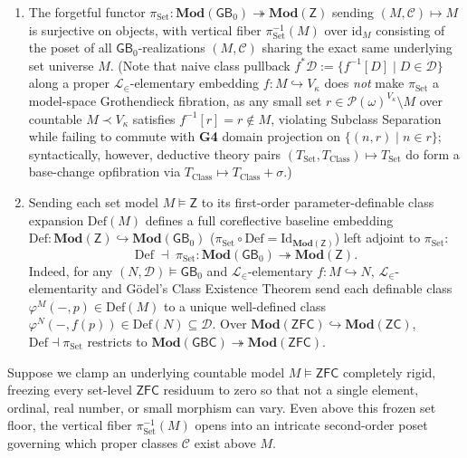 \begin{definition}
\begin{enumerate}[label=\textup{(\roman*)},leftmargin=1.8em]
  \item The forgetful functor $\pi_{\mathrm{Set}} : \mathbf{Mod}(\mathsf{GB}_0) \twoheadrightarrow \mathbf{Mod}(\mathsf{Z})$ sending $(M, \mathcal{C}) \mapsto M$ is surjective on objects, with vertical fiber $\pi_{\mathrm{Set}}^{-1}(M)$ over $\mathrm{id}_M$ consisting of the poset of all $\mathsf{GB}_0$-realizations $(M, \mathcal{C})$ sharing the exact same underlying set universe $M$. (Note that naive class pullback $f^*\mathcal{D} := \{f^{-1}[D] \mid D \in \mathcal{D}\}$ along a proper $\mathcal{L}_\in$-elementary embedding $f : M \hookrightarrow V_\kappa$ does \emph{not} make $\pi_{\mathrm{Set}}$ a model-space Grothendieck fibration, as any small set $r \in \mathcal{P}(\omega)^{V_\kappa} \setminus M$ over countable $M \prec V_\kappa$ satisfies $f^{-1}[r] = r \notin M$, violating Subclass Separation while failing to commute with \textbf{G4} domain projection on $\{(n, r) \mid n \in r\}$; syntactically, however, deductive theory pairs $(T_{\mathrm{Set}}, T_{\mathrm{Class}}) \mapsto T_{\mathrm{Set}}$ do form a base-change opfibration via $T_{\mathrm{Class}} \mapsto T_{\mathrm{Class}} + \sigma$.)
  \item Sending each set model $M \models \mathsf{Z}$ to its first-order parameter-definable class expansion $\mathrm{Def}(M)$ defines a full coreflective baseline embedding $\mathrm{Def} : \mathbf{Mod}(\mathsf{Z}) \hookrightarrow \mathbf{Mod}(\mathsf{GB}_0)$ ($\pi_{\mathrm{Set}} \circ \mathrm{Def} = \mathrm{Id}_{\mathbf{Mod}(\mathsf{Z})}$) left adjoint to $\pi_{\mathrm{Set}}$:
  \[
    \mathrm{Def} \;\dashv\; \pi_{\mathrm{Set}} : \mathbf{Mod}(\mathsf{GB}_0) \twoheadrightarrow \mathbf{Mod}(\mathsf{Z}).
  \]
  Indeed, for any $(N, \mathcal{D}) \models \mathsf{GB}_0$ and $\mathcal{L}_\in$-elementary $f : M \hookrightarrow N$, $\mathcal{L}_\in$-elementarity and G\"odel's Class Existence Theorem send each definable class $\varphi^M(-, p) \in \mathrm{Def}(M)$ to a unique well-defined class $\varphi^N(-, f(p)) \in \mathrm{Def}(N) \subseteq \mathcal{D}$. Over $\mathbf{Mod}(\mathsf{ZFC}) \hookrightarrow \mathbf{Mod}(\mathsf{ZC})$, $\mathrm{Def} \dashv \pi_{\mathrm{Set}}$ restricts to $\mathbf{Mod}(\mathsf{GBC}) \twoheadrightarrow \mathbf{Mod}(\mathsf{ZFC})$.
\end{enumerate}
\end{definition}

Suppose we clamp an underlying countable model $M \models \mathsf{ZFC}$ completely rigid, freezing every set-level $\mathsf{ZFC}$ residuum to zero so that not a single element, ordinal, real number, or small morphism can vary. Even above this frozen set floor, the vertical fiber $\pi_{\mathrm{Set}}^{-1}(M)$ opens into an intricate second-order poset governing which proper classes $\mathcal{C}$ exist above $M$.

